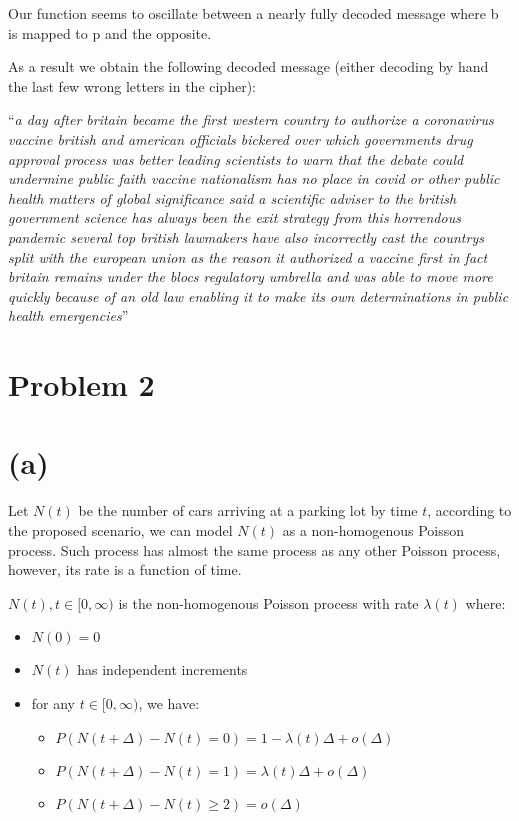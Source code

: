 \documentclass[]{article}
\providecommand{\tightlist}{%
  \setlength{\itemsep}{0pt}\setlength{\parskip}{0pt}}
\begin{document}
Our function seems to oscillate between a nearly fully decoded message
where b is mapped to p and the opposite.

As a result we obtain the following decoded message (either decoding by
hand the last few wrong letters in the cipher):

``\emph{a day after britain became the first western country to
authorize a coronavirus vaccine british and american officials bickered
over which governments drug approval process was better leading
scientists to warn that the debate could undermine public faith vaccine
nationalism has no place in covid or other public health matters of
global significance said a scientific adviser to the british government
science has always been the exit strategy from this horrendous pandemic
several top british lawmakers have also incorrectly cast the countrys
split with the european union as the reason it authorized a vaccine
first in fact britain remains under the blocs regulatory umbrella and
was able to move more quickly because of an old law enabling it to make
its own determinations in public health emergencies}''

\newpage

\hypertarget{problem-2}{%
\section{Problem 2}\label{problem-2}}

\hypertarget{a}{%
\section{(a)}\label{a}}

Let \textbf{\(N(t)\)} be the number of cars arriving at a parking lot by
time \textbf{\(t\)}, according to the proposed scenario, we can model
\textbf{\(N(t)\)} as a non-homogenous Poisson process. Such process has
almost the same process as any other Poisson process, however, its rate
is a function of time.

\(N(t), t \in [0, \infty)\) is the non-homogenous Poisson process with
rate \(\lambda (t)\) where:

\begin{itemize}
\tightlist
\item
  \(N(0) = 0\)
\item
  \(N(t)\) has independent increments
\item
  for any \(t \in [0, \infty)\), we have:

  \begin{itemize}
  \tightlist
  \item
    \(P(N(t + \Delta) - N(t) = 0) = 1 - \lambda (t) \Delta + o(\Delta)\)
  \item
    \(P(N(t + \Delta) - N(t) = 1) = \lambda (t) \Delta + o(\Delta)\)
  \item
    \(P(N(t + \Delta) - N(t) \geq 2) = o(\Delta)\)
  \end{itemize}
\end{itemize}
\end{document}
